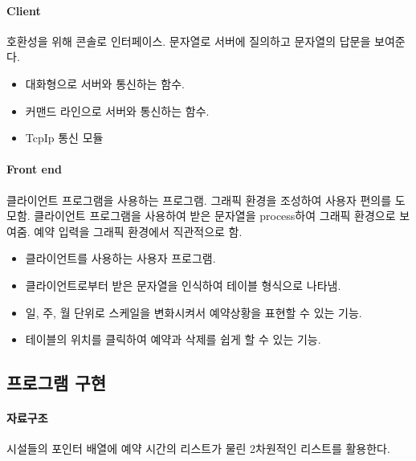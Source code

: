 \documentclass[12pt,a4paper]{report}
\begin{document}
\paragraph{Client} 
호환성을 위해 콘솔로 인터페이스.
문자열로 서버에 질의하고 문자열의 답문을 보여준다.
\begin{itemize}
	\item 대화형으로 서버와 통신하는 함수.
	\item 커맨드 라인으로 서버와 통신하는 함수.
	\item TcpIp 통신 모듈
\end{itemize}

\paragraph{Front end}
클라이언트 프로그램을 사용하는 프로그램. 그래픽 환경을 조성하여 사용자 편의를 도모함.
클라이언트 프로그램을 사용하여 받은 문자열을 process하여 그래픽 환경으로 보여줌. 예약 입력을 그래픽 환경에서 직관적으로 함.
\begin{itemize}
	\item 클라이언트를 사용하는 사용자 프로그램.
	\item 클라이언트로부터 받은 문자열을 인식하여 테이블 형식으로 나타냄.
	\item 일, 주, 월 단위로 스케일을 변화시켜서 예약상황을 표현할 수 있는 기능.
	\item 테이블의 위치를 클릭하여 예약과 삭제를 쉽게 할 수 있는 기능.
\end{itemize}

\subsection{프로그램 구현}

\paragraph{자료구조}
시설들의 포인터 배열에 예약 시간의 리스트가 물린 2차원적인 리스트를 활용한다.\\

\end{document}
